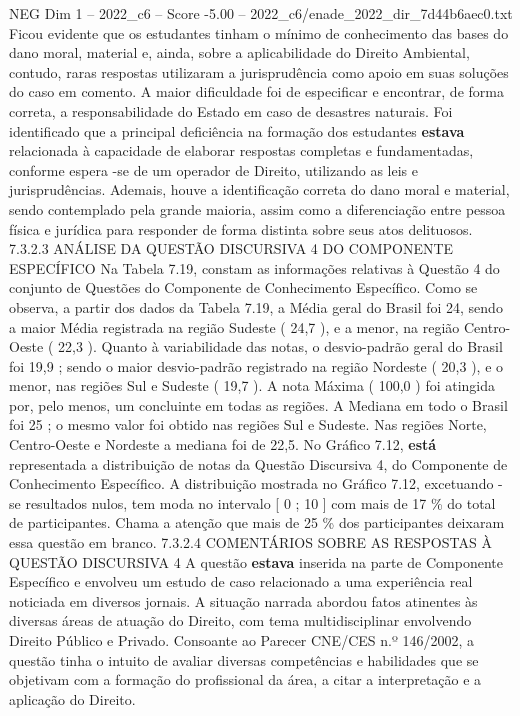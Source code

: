 \begin{textsample}{NEG Dim 1 – 2022\_c6 – Score -5.00 – 2022\_c6/enade\_2022\_dir\_7d44b6aec0.txt}
Ficou evidente que os estudantes tinham o mínimo de conhecimento das bases do dano moral, material e, ainda, sobre a aplicabilidade do Direito Ambiental, contudo, raras respostas utilizaram a jurisprudência como apoio em suas soluções do caso em comento.
A maior dificuldade foi de especificar e encontrar, de forma correta, a responsabilidade do Estado em caso de desastres naturais.
Foi identificado que a principal deficiência na formação dos estudantes \textbf{estava} relacionada à capacidade de elaborar respostas completas e fundamentadas, conforme espera -se de um operador de Direito, utilizando as leis e jurisprudências.
Ademais, houve a identificação correta do dano moral e material, sendo contemplado pela grande maioria, assim como a diferenciação entre pessoa física e jurídica para responder de forma distinta sobre seus atos delituosos. 7.3.2.3 ANÁLISE DA QUESTÃO DISCURSIVA 4 DO COMPONENTE ESPECÍFICO Na Tabela 7.19, constam as informações relativas à Questão 4 do conjunto de Questões do Componente de Conhecimento Específico.
Como se observa, a partir dos dados da Tabela 7.19, a Média geral do Brasil foi 24, sendo a maior Média registrada na região Sudeste ( 24,7 ), e a menor, na região Centro-Oeste ( 22,3 ).
Quanto à variabilidade das notas, o desvio-padrão geral do Brasil foi 19,9 ; sendo o maior desvio-padrão registrado na região Nordeste ( 20,3 ), e o menor, nas regiões Sul e Sudeste ( 19,7 ).
A nota Máxima ( 100,0 ) foi atingida por, pelo menos, um concluinte em todas as regiões.
A Mediana em todo o Brasil foi 25 ; o mesmo valor foi obtido nas regiões Sul e Sudeste.
Nas regiões Norte, Centro-Oeste e Nordeste a mediana foi de 22,5.
No Gráfico 7.12, \textbf{está} representada a distribuição de notas da Questão Discursiva 4, do Componente de Conhecimento Específico.
A distribuição mostrada no Gráfico 7.12, excetuando -se resultados nulos, tem moda no intervalo [ 0 ; 10 ] com mais de 17 \% do total de participantes.
Chama a atenção que mais de 25 \% dos participantes deixaram essa questão em branco. 7.3.2.4 COMENTÁRIOS SOBRE AS RESPOSTAS À QUESTÃO DISCURSIVA 4 A questão \textbf{estava} inserida na parte de Componente Específico e envolveu um estudo de caso relacionado a uma experiência real noticiada em diversos jornais.
A situação narrada abordou fatos atinentes às diversas áreas de atuação do Direito, com tema multidisciplinar envolvendo Direito Público e Privado.
Consoante ao Parecer CNE/CES n.º 146/2002, a questão tinha o intuito de avaliar diversas competências e habilidades que se objetivam com a formação do profissional da área, a citar a interpretação e a aplicação do Direito.

\end{textsample}
